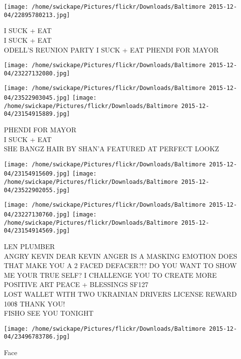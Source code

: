 \documentclass[10pt,letterpaper]{article}
\begin{document}
\vspace{0.25in}
\texttt{[image: /home/swickape/Pictures/flickr/Downloads/Baltimore 2015-12-04/22895780213.jpg]}

I SUCK + EAT\\
I SUCK + EAT\\
ODELL'S REUNION PARTY I SUCK + EAT PHENDI FOR MAYOR
\pagebreak

\texttt{[image: /home/swickape/Pictures/flickr/Downloads/Baltimore 2015-12-04/23227132080.jpg]}

\vspace{0.25in}
\texttt{[image: /home/swickape/Pictures/flickr/Downloads/Baltimore 2015-12-04/23522903045.jpg]}
\texttt{[image: /home/swickape/Pictures/flickr/Downloads/Baltimore 2015-12-04/23154915889.jpg]}

PHENDI FOR MAYOR\\
I SUCK + EAT\\
SHE BANGZ HAIR BY SHAN'A FEATURED AT PERFECT LOOKZ
\pagebreak

\texttt{[image: /home/swickape/Pictures/flickr/Downloads/Baltimore 2015-12-04/23154915609.jpg]}
\texttt{[image: /home/swickape/Pictures/flickr/Downloads/Baltimore 2015-12-04/23522902055.jpg]}

\texttt{[image: /home/swickape/Pictures/flickr/Downloads/Baltimore 2015-12-04/23227130760.jpg]}
\texttt{[image: /home/swickape/Pictures/flickr/Downloads/Baltimore 2015-12-04/23154914569.jpg]}

LEN PLUMBER\\
ANGRY KEVIN DEAR KEVIN ANGER IS A MASKING EMOTION DOES THAT MAKE YOU A 2 FACED DEFACER?!?  DO YOU WANT TO SHOW ME YOUR TRUE SELF?  I CHALLENGE YOU TO CREATE MORE POSITIVE ART PEACE + BLESSINGS SF127\\
LOST WALLET WITH TWO UKRAINIAN DRIVERS LICENSE REWARD 100\$ THANK YOU!\\
FISHO SEE YOU TONIGHT
\pagebreak

\texttt{[image: /home/swickape/Pictures/flickr/Downloads/Baltimore 2015-12-04/23496783786.jpg]}

Face
\pagebreak
\end{document}
